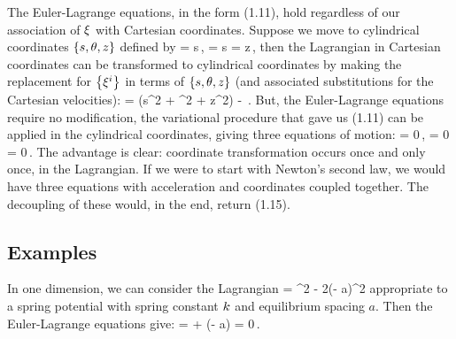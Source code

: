 The Euler-Lagrange equations, in the form (1.11), hold regardless of our association of $\xi$ with Cartesian coordinates. Suppose we move to cylindrical coordinates $\left\lbrace{s, \theta, z}\right\rbrace$ defined by
\beq
{} = s\cos\vat\theta\,,\quad
{} = s\sin\vat\theta   \quad{}\quad
{} = z\,,
\eeq
then the Lagrangian in Cartesian coordinates can be transformed to cylindrical coordinates by making the replacement for $\left\lbrace{{\xi}^{i}}\right\rbrace$ in terms of $\left\lbrace{s, \theta, z}\right\rbrace$ (and associated substitutions for the Cartesian velocities):
\beq
\lag = \mass\left(\dt s^2 + \dt\theta^2 + \dt z^2\right) - \pen{}\,.
\eeq
But, the Euler-Lagrange equations require no modification, the variational procedure that gave us (1.11) can be applied in the cylindrical coordinates, giving three equations of motion:
\beq
{}\lag          = 0\,,\quad
\elop{\theta}{\dt\theta}\lag = 0   \quad{}\quad
{}\lag          = 0\,.
\eeq
The advantage is clear: coordinate transformation occurs once and only once, in the Lagrangian. If we were to start with Newton's second law, we would have three equations with acceleration and coordinates coupled together. The decoupling of these would, in the end, return (1.15).


\subsection{Examples}
In one dimension, we can consider the Lagrangian
\lag = \mass\vel^2 - 2\kspring\left(\pos - a\right)^2
\eeq
appropriate to a spring potential with spring constant $k$ and equilibrium spacing $a$. Then the Euler-Lagrange equations give:
\beq
\elop{\pos}{\vel}\lag = \mass\acc + \kspring\left(\pos - a\right) = 0\,.
\eeq
